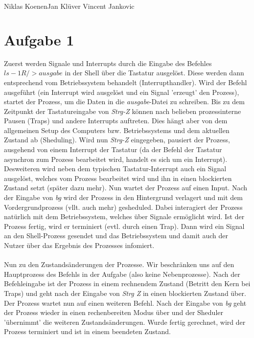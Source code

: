 \documentclass{ti2}
\begin{document}
%
                {Niklas Koenen}{Jan Klüver}%
                {Vincent Jankovic}{}%

\section*{Aufgabe 1}
Zuerst werden Signale und Interrupts durch die Eingabe des Befehles $ls -1R / > ausgabe$ in der Shell über die Tastatur ausgelöst. Diese werden dann entsprechend vom Betriebssystem behandelt (Interrupthandler). Wird der Befehl ausgeführt (ein Interrupt wird ausgelöst und ein Signal 'erzeugt' den Prozess), startet der Prozess, um die Daten in die \emph{ausgabe}-Datei zu schreiben. Bis zu dem Zeitpunkt der Tastatureingabe von \emph{Strg-Z} können nach belieben prozessinterne Pausen  (Traps) und andere Interrupts auftreten. Dies hängt aber von dem allgemeinen Setup des Computers bzw. Betriebssystems und dem aktuellen Zustand ab (Sheduling). Wird nun \emph{Strg-Z} eingegeben, pausiert der Prozess, ausgehend von einem Interrupt der Tastatur (da der Befehl der Tastatur asynchron zum Prozess bearbeitet wird, handelt es sich um ein Interrupt). Desweiteren wird neben dem typischen Tastatur-Interrupt auch ein Signal ausgelöst, welches vom Prozess bearbeitet wird und ihn in einen blockierten Zustand setzt (später dazu mehr). Nun wartet der Prozess auf einen Input. Nach der Eingabe von \emph{bg} wird der Prozess in den Hintergrund verlagert und mit dem Vordergrundprozess (vllt. auch mehr) gesheduled. Dabei interagiert der Prozess natürlich mit dem Betriebssystem, welches über Signale ermöglicht wird. Ist der Prozess fertig, wird er terminiert (evtl. durch einen Trap). Dann wird ein Signal an den Shell-Prozess gesendet und das Betriebssystem und damit auch der Nutzer über das Ergebnis des Prozesses infomiert. \\\\
Nun zu den Zustands\"anderungen der Prozesse. Wir beschr\"anken uns auf den Hauptprozess des Befehls in der Aufgabe (also keine Nebenprozesse). Nach der Befehleingabe ist der Prozess in einem rechnendem Zustand (Betritt den Kern bei Traps) und geht nach der Eingabe von \emph{Strg Z} in einen blockierten Zustand \"uber. Der Prozess wartet nun auf einen weiteren Befehl. Nach der Eingabe von \emph{bg} geht der Prozess wieder in einen rechenbereiten Modus \"uber und der Sheduler '\"ubernimmt' die weiteren Zustands\"anderungen. Wurde fertig gerechnet, wird der Prozess terminiert und ist in einem beendeten Zustand.
\end{document}

